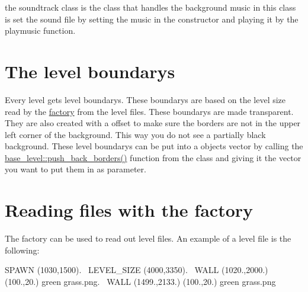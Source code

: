 the soundtrack class is the class that handles the background music in this class is set the sound file by setting the music in the constructor and playing it by the playmusic function.\hypertarget{index_base_level}{}\section{The level boundary\textquotesingle{}s}\label{index_base_level}
Every level gets level boundary\textquotesingle{}s. These boundary\textquotesingle{}s are based on the level size read by the \hyperlink{classfactory}{factory} from the level files. These boundary\textquotesingle{}s are made transparent. They are also created with a offset to make sure the borders are not in the upper left corner of the background. This way you do not see a partially black background. These level boundary\textquotesingle{}s can be put into a objects vector by calling the \hyperlink{classbase__level_a3b2da28cf45cad434103e81ee6c4538d}{base\+\_\+level\+::push\+\_\+back\+\_\+borders()} function from the class and giving it the vector you want to put them in as parameter.\hypertarget{index_factory}{}\section{Reading files with the factory}\label{index_factory}
The factory can be used to read out level files. An example of a level file is the following\+:

S\+P\+A\+WN (1030,1500).~\newline
 L\+E\+V\+E\+L\+\_\+\+S\+I\+ZE (4000,3350).~\newline
 W\+A\+LL (1020.,2000.) (100.,20.) green grass.\+png.~\newline
 W\+A\+LL (1499.,2133.) (100.,20.) green grass.\+png

